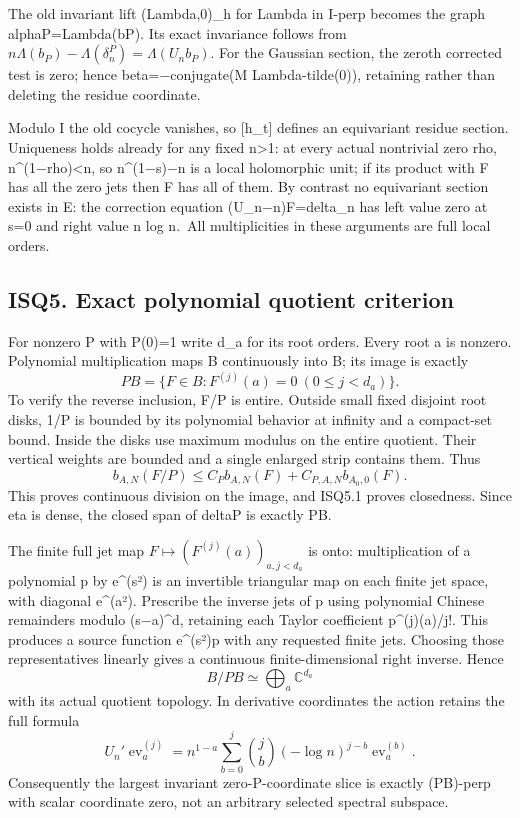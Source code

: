 \documentclass[
]{article}
\begin{document}
The old invariant lift (Lambda,0)\_h for Lambda in I-perp becomes the graph alphaP=Lambda(bP). Its exact invariance follows from \(n\Lambda(b_P)-\Lambda(\delta^P_n)=\Lambda(U_nb_P)\). For the Gaussian section, the zeroth corrected test is zero; hence beta=−conjugate(M Lambda-tilde(0)), retaining rather than deleting the residue coordinate.

Modulo I the old cocycle vanishes, so {[}h\_t{]} defines an equivariant residue section. Uniqueness holds already for any fixed n\textgreater1: at every actual nontrivial zero rho, \textbar n\^{}(1−rho)\textbar\textless n, so n\^{}(1−s)−n is a local holomorphic unit; if its product with F has all the zero jets then F has all of them. By contrast no equivariant section exists in E: the correction equation (U\_n−n)F=delta\_n has left value zero at s=0 and right value n log n.~All multiplicities in these arguments are full local orders.

\subsection{ISQ5. Exact polynomial quotient criterion}\label{isq5.-exact-polynomial-quotient-criterion}

For nonzero P with P(0)=1 write d\_a for its root orders. Every root a is nonzero. Polynomial multiplication maps B continuously into B; its image is exactly \[
PB=\{F\in B:F^{(j)}(a)=0\ (0\le j<d_a)\}.
\tag{ISQ5.1}
\] To verify the reverse inclusion, F/P is entire. Outside small fixed disjoint root disks, 1/P is bounded by its polynomial behavior at infinity and a compact-set bound. Inside the disks use maximum modulus on the entire quotient. Their vertical weights are bounded and a single enlarged strip contains them. Thus \[
b_{A,N}(F/P)\le C_Pb_{A,N}(F)+C_{P,A,N}b_{A_0,0}(F).
\tag{ISQ5.2}
\] This proves continuous division on the image, and ISQ5.1 proves closedness. Since eta is dense, the closed span of deltaP is exactly PB.

The finite full jet map \(F\mapsto(F^{(j)}(a))_{a,j<d_a}\) is onto: multiplication of a polynomial p by e\^{}(s²) is an invertible triangular map on each finite jet space, with diagonal e\^{}(a²). Prescribe the inverse jets of p using polynomial Chinese remainders modulo (s−a)\^{}d, retaining each Taylor coefficient p\^{}(j)(a)/j!. This produces a source function e\^{}(s²)p with any requested finite jets. Choosing those representatives linearly gives a continuous finite-dimensional right inverse. Hence \[
B/PB\simeq\bigoplus_a\mathbb C^{d_a}
\tag{ISQ5.3}
\] with its actual quotient topology. In derivative coordinates the action retains the full formula \[
U_n'\operatorname{ev}_a^{(j)}
=n^{1-a}\sum_{b=0}^j\binom jb(-\log n)^{j-b}
\operatorname{ev}_a^{(b)}.
\tag{ISQ5.4}
\] Consequently the largest invariant zero-P-coordinate slice is exactly (PB)-perp with scalar coordinate zero, not an arbitrary selected spectral subspace.
\end{document}
